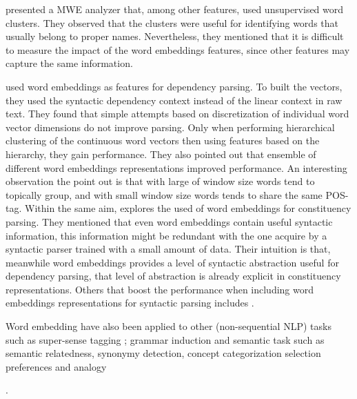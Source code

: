 \documentclass[11pt]{article}
\begin{document}
 presented a MWE analyzer that, among other features, used unsupervised word clusters. 
They observed that the clusters were useful for identifying words that usually belong to proper names.
Nevertheless, they mentioned that it is difficult to measure the impact
of the word embeddings features, since other features may capture the same information.

 used word embeddings as features for dependency parsing. To built the vectors, they used the syntactic dependency context instead of the linear context in raw text.
They found that simple attempts based on discretization of individual word vector dimensions do not improve parsing. 
Only when performing hierarchical clustering of the continuous word vectors 
then using features based on the hierarchy, they gain performance. 
They also pointed out that ensemble of different word embeddings representations improved performance.
An interesting observation the point out is that with large of window size words tend to topically group, and with small window size words tends to share the same POS-tag.
Within the same aim, \cite{Andreas:Klein:2014} explores the used of word embeddings for constituency parsing. They mentioned that even word embeddings contain useful syntactic information, this information might be redundant  with the one acquire by a syntactic parser trained with a small amount of data. Their intuition is that, meanwhile word embeddings provides a level of syntactic abstraction useful for dependency parsing, that level of abstraction is already explicit in constituency representations.
Others that boost the performance when including word embeddings representations for syntactic parsing includes \cite{Koo:2008,Koo:2010,Haffari:2011,Tratz:2011}.

Word embedding have also been applied to other (non-sequential NLP) tasks
such as super-sense tagging \cite{Grave:2013}; grammar induction \cite{Spitkovsky:2011} and semantic task such as semantic relatedness, synonymy detection, concept categorization selection preferences and analogy \cite{baroni:2014}



.  

\end{document}
